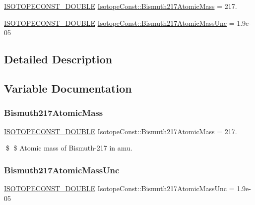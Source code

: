 \begin{DoxyCompactItemize}
\item 
\mbox{\hyperlink{group___isotope_const-_macros_ga8f45a7272ce02c0b4c65c44636ed719a}{I\+S\+O\+T\+O\+P\+E\+C\+O\+N\+S\+T\+\_\+\+D\+O\+U\+B\+LE}} \mbox{\hyperlink{group___isotope_const-_bismuth-_bi217_gad4b1bd17b8698f44cda3766e3ed15e33}{Isotope\+Const\+::\+Bismuth217\+Atomic\+Mass}} = 217.
\item 
\mbox{\hyperlink{group___isotope_const-_macros_ga8f45a7272ce02c0b4c65c44636ed719a}{I\+S\+O\+T\+O\+P\+E\+C\+O\+N\+S\+T\+\_\+\+D\+O\+U\+B\+LE}} \mbox{\hyperlink{group___isotope_const-_bismuth-_bi217_ga8883b8a667cda974fbf1bbeb9e6f6520}{Isotope\+Const\+::\+Bismuth217\+Atomic\+Mass\+Unc}} = 1.\+9e-\/05
\end{DoxyCompactItemize}


\subsection{Detailed Description}


\subsection{Variable Documentation}
\mbox{\label{group___isotope_const-_bismuth-_bi217_gad4b1bd17b8698f44cda3766e3ed15e33}} 
\subsubsection{\texorpdfstring{Bismuth217\+Atomic\+Mass}{Bismuth217AtomicMass}}
{\footnotesize\ttfamily \mbox{\hyperlink{group___isotope_const-_macros_ga8f45a7272ce02c0b4c65c44636ed719a}{I\+S\+O\+T\+O\+P\+E\+C\+O\+N\+S\+T\+\_\+\+D\+O\+U\+B\+LE}} Isotope\+Const\+::\+Bismuth217\+Atomic\+Mass = 217.}

\$ \$ Atomic mass of Bismuth-\/217 in amu. \mbox{\label{group___isotope_const-_bismuth-_bi217_ga8883b8a667cda974fbf1bbeb9e6f6520}} 
\subsubsection{\texorpdfstring{Bismuth217\+Atomic\+Mass\+Unc}{Bismuth217AtomicMassUnc}}
{\footnotesize\ttfamily \mbox{\hyperlink{group___isotope_const-_macros_ga8f45a7272ce02c0b4c65c44636ed719a}{I\+S\+O\+T\+O\+P\+E\+C\+O\+N\+S\+T\+\_\+\+D\+O\+U\+B\+LE}} Isotope\+Const\+::\+Bismuth217\+Atomic\+Mass\+Unc = 1.\+9e-\/05}

